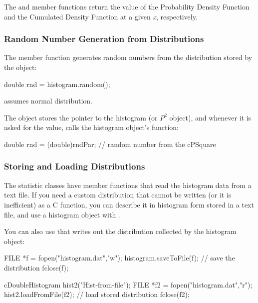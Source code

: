 The  and  member functions
return the value of the Probability Density Function and the Cumulated
Density Function at a given \textit{x}, respectively.


\subsubsection{Random Number Generation from Distributions}
\label{sec:sim-lib:random-number-generation-from-distributions}


The  member function generates random
numbers from the distribution stored by the
object:

\begin{cpp}
double rnd = histogram.random();
\end{cpp}


 assumes normal distribution.

The  object stores the pointer to the histogram (or $P^{2}$ object),
and whenever it is asked for the value, calls the histogram object's 
function:

\begin{cpp}
double rnd = (double)rndPar; // random number from the cPSquare
\end{cpp}

\subsubsection{Storing and Loading Distributions}
\label{sec:sim-lib:storing-and-loading-distributions}


The statistic classes have  member functions
that read the histogram data from a text file. If you need a custom
distribution that cannot be written (or it
is inefficient) as a C function, you can describe it in histogram form
stored in a text file, and use a histogram object with
.

You can also use that writes out the distribution
collected by the histogram object:

\begin{cpp}
FILE *f = fopen("histogram.dat","w");
histogram.saveToFile(f); // save the distribution
fclose(f);

cDoubleHistogram hist2("Hist-from-file");
FILE *f2 = fopen("histogram.dat","r");
hist2.loadFromFile(f2); // load stored distribution
fclose(f2);
\end{cpp}


